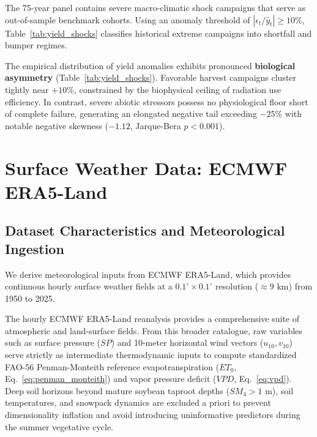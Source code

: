 The 75-year panel contains severe macro-climatic shock campaigns that serve as out-of-sample benchmark cohorts. Using an anomaly threshold of $|\epsilon_t / \hat{y}_t| \ge 10\%$, Table~\ref{tab:yield_shocks} classifies historical extreme campaigns into shortfall and bumper regimes.



The empirical distribution of yield anomalies exhibits pronounced \textbf{biological asymmetry} (Table~\ref{tab:yield_shocks}). Favorable harvest campaigns cluster tightly near $+10\%$, constrained by the biophysical ceiling of radiation use efficiency. In contrast, severe abiotic stressors possess no physiological floor short of complete failure, generating an elongated negative tail exceeding $-25\%$ with notable negative skewness ($-1.12$, Jarque-Bera $p < 0.001$).


\section{Surface Weather Data: ECMWF ERA5-Land}
\label{sec:data_era5}

\subsection{Dataset Characteristics and Meteorological Ingestion}
\label{sec:data_era5_characteristics}

We derive meteorological inputs from ECMWF ERA5-Land, which provides continuous hourly surface weather fields at a $0.1^\circ \times 0.1^\circ$ resolution ($\approx 9\text{ km}$) from 1950 to 2025.

The hourly ECMWF ERA5-Land reanalysis provides a comprehensive suite of atmospheric and land-surface fields. From this broader catalogue, raw variables such as surface pressure ($SP$) and 10-meter horizontal wind vectors ($u_{10}, v_{10}$) serve strictly as intermediate thermodynamic inputs to compute standardized FAO-56 Penman-Monteith reference evapotranspiration ($ET_0$, Eq.~\eqref{eq:penman_monteith}) and vapor pressure deficit ($VPD$, Eq.~\eqref{eq:vpd}). Deep soil horizons beyond mature soybean taproot depths ($SM_4 > 1\text{ m}$), soil temperatures, and snowpack dynamics are excluded a priori to prevent dimensionality inflation and avoid introducing uninformative predictors during the summer vegetative cycle.

